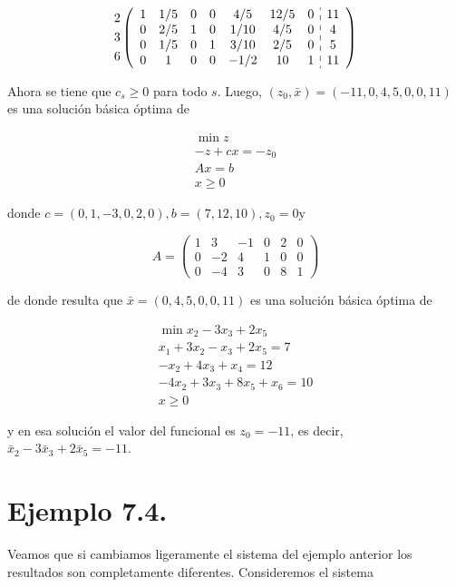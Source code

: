 \documentclass[10pt]{article}
\begin{document}
$$
\begin{aligned}
& 2 \\
& 3 \\
& 6
\end{aligned}\left(\begin{array}{ccccccc:c}
1 & 1 / 5 & 0 & 0 & 4 / 5 & 12 / 5 & 0 & 11 \\
0 & 2 / 5 & 1 & 0 & 1 / 10 & 4 / 5 & 0 & 4 \\
0 & 1 / 5 & 0 & 1 & 3 / 10 & 2 / 5 & 0 & 5 \\
0 & 1 & 0 & 0 & -1 / 2 & 10 & 1 & 11
\end{array}\right)
$$

Ahora se tiene que $c_{s} \geq 0$ para todo $s$. Luego, $\left(z_{0}, \bar{x}\right)=(-11,0,4,5,0,0,11)$ es una solución básica óptima de

$$
\begin{gathered}
\min z \\
-z+c x=-z_{0} \\
A x=b \\
x \geq 0
\end{gathered}
$$

donde $c=(0,1,-3,0,2,0), b=(7,12,10), z_{0}=0 \mathrm{y}$

$$
A=\left(\begin{array}{cccccc}
1 & 3 & -1 & 0 & 2 & 0 \\
0 & -2 & 4 & 1 & 0 & 0 \\
0 & -4 & 3 & 0 & 8 & 1
\end{array}\right)
$$

de donde resulta que $\bar{x}=(0,4,5,0,0,11)$ es una solución básica óptima de

$$
\begin{gathered}
\min x_{2}-3 x_{3}+2 x_{5} \\
x_{1}+3 x_{2}-x_{3}+2 x_{5}=7 \\
-x_{2}+4 x_{3}+x_{4}=12 \\
-4 x_{2}+3 x_{3}+8 x_{5}+x_{6}=10 \\
x \geq 0
\end{gathered}
$$

y en esa solución el valor del funcional es $z_{0}=-11$, es decir, $\bar{x}_{2}-3 \bar{x}_{3}+2 \bar{x}_{5}=-11$.

\section*{Ejemplo 7.4.}
Veamos que si cambiamos ligeramente el sistema del ejemplo anterior los resultados son completamente diferentes. Consideremos el sistema
\end{document}
